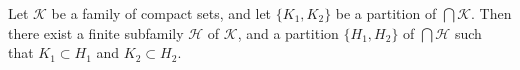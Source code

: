 Let $\mathcal{K}$ be a family of compact sets, and let $\{K_1, K_2\}$ be a partition of $\bigcap \mathcal{K}$. Then there exist a finite subfamily $\mathcal{H}$ of $\mathcal{K}$, and a partition $\{H_1, H_2\}$ of $\bigcap \mathcal{H}$ such that $K_1 \subset H_1$ and $K_2 \subset H_2$.
